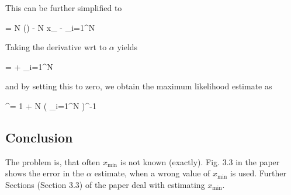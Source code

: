 This can be further simplified to

\bee
{} = N \ln () - N \ln x_{} - \alpha \sum_{i=1}^N \ln {}
\eee

Taking the derivative wrt to $\alpha$ yields

\bee
{} =  + \sum_{i=1}^N \ln {}
\eee

and by setting this to zero, we obtain the maximum likelihood estimate as

\bee
\alpha^\star = 1 + N \left( \sum_{i=1}^N \ln {} \right)^{-1}
\eee

\subsection{Conclusion}

The problem is, that often $x_{\text{min}}$ is not known (exactly). Fig. 3.3 in the paper shows the error in the $\alpha$ estimate, when a wrong value of $x_{\text{min}}$ is used. Further Sections (Section 3.3) of the paper deal with estimating $x_{\text{min}}$.




